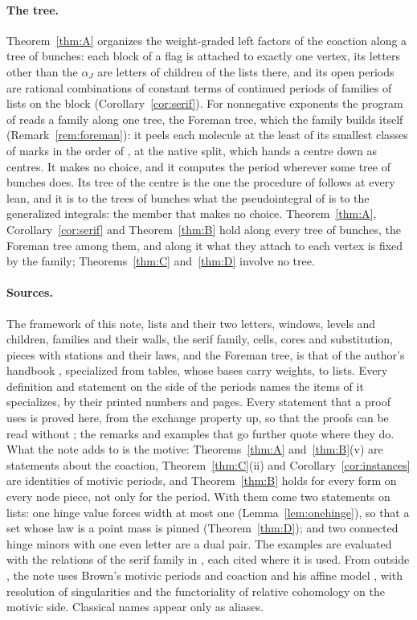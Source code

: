 \documentclass[11pt]{article}
\theoremstyle{plain}
\theoremstyle{definition}
\theoremstyle{remark}
\begin{document}
\paragraph{The tree.} Theorem~\ref{thm:A} organizes the weight-graded left factors of the coaction along a tree of bunches: each block of a flag is attached to exactly one vertex, its letters other than the $\alpha_J$ are letters of children of the lists there, and its open periods are rational combinations of constant terms of continued periods of families of lists on the block (Corollary~\ref{cor:serif}). For nonnegative exponents the program of \cite{F} reads a family along one tree, the Foreman tree, which the family builds itself (Remark~\ref{rem:foreman}): it peels each molecule at the least of its smallest classes of marks in the order of \cite[Def.~13.5, p.~78; Thm.~13.7, p.~79]{F}, at the native split, which hands a centre down as centres. It makes no choice, and it computes the period wherever some tree of bunches does. Its tree of the centre is the one the procedure of \cite[Def.~16.12, p.~97]{F} follows at every lean, and it is to the trees of bunches what the pseudointegral of \cite[Def.~16.26, p.~101]{F} is to the generalized integrals: the member that makes no choice. Theorem~\ref{thm:A}, Corollary~\ref{cor:serif} and Theorem~\ref{thm:B} hold along every tree of bunches, the Foreman tree among them, and along it what they attach to each vertex is fixed by the family; Theorems~\ref{thm:C} and~\ref{thm:D} involve no tree.

\paragraph{Sources.} The framework of this note, lists and their two letters, windows, levels and children, families and their walls, the serif family, cells, cores and substitution, pieces with stations and their laws, and the Foreman tree, is that of the author's handbook \cite{F}, specialized from tables, whose bases carry weights, to lists. Every definition and statement on the side of the periods names the items of \cite{F} it specializes, by their printed numbers and pages. Every statement that a proof uses is proved here, from the exchange property up, so that the proofs can be read without \cite{F}; the remarks and examples that go further quote \cite{F} where they do. What the note adds to \cite{F} is the motive: Theorems~\ref{thm:A} and~\ref{thm:B}(v) are statements about the coaction, Theorem~\ref{thm:C}(ii) and Corollary~\ref{cor:instances} are identities of motivic periods, and Theorem~\ref{thm:B} holds for every form on every node piece, not only for the period. With them come two statements on lists: one hinge value forces width at most one (Lemma~\ref{lem:onehinge}), so that a set whose law is a point mass is pinned (Theorem~\ref{thm:D}); and two connected hinge minors with one even letter are a dual pair. The examples are evaluated with the relations of the serif family in \cite{F}, each cited where it is used. From outside \cite{F}, the note uses Brown's motivic periods and coaction \cite{B1} and his affine model \cite{B2}, with resolution of singularities \cite{Hi} and the functoriality of relative cohomology \cite{HMS} on the motivic side. Classical names appear only as aliases.
\end{document}
